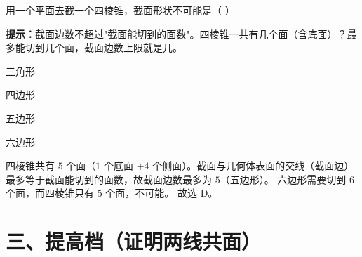 \documentclass{exam-zh}
\begin{document}
\begin{question}[points=6]
  \noindent
  \begin{minipage}[t]{\dimexpr\linewidth-60mm-6mm\relax}
    \vspace{0pt}
    用一个平面去截一个四棱锥，截面形状不可能是（    ）
    \begin{hintbox}
\textbf{提示：}截面边数不超过"截面能切到的面数"。四棱锥一共有几个面（含底面）？最多能切到几个面，截面边数上限就是几。\end{hintbox}

    \par
    \begin{choices}[columns=1]
      \item 三角形
      \item 四边形
      \item 五边形
      \item 六边形
    \end{choices}
  \end{minipage}\hfill
  \begin{diagramcoltikz}{60mm}{四棱锥有 5 个面（1 底面 + 4 侧面），截面边数最多 5。}
  }
  \end{diagramcoltikz}
  \paren[D]
  \begin{solutionblock}
    四棱锥共有 $5$ 个面（$1$ 个底面 $+4$ 个侧面）。截面与几何体表面的交线（截面边）最多等于截面能切到的面数，故截面边数最多为 $5$（五边形）。
六边形需要切到 $6$ 个面，而四棱锥只有 $5$ 个面，不可能。
故选 D。
  \end{solutionblock}
\end{question}



\section*{三、提高档（证明两线共面）}

\end{document}
